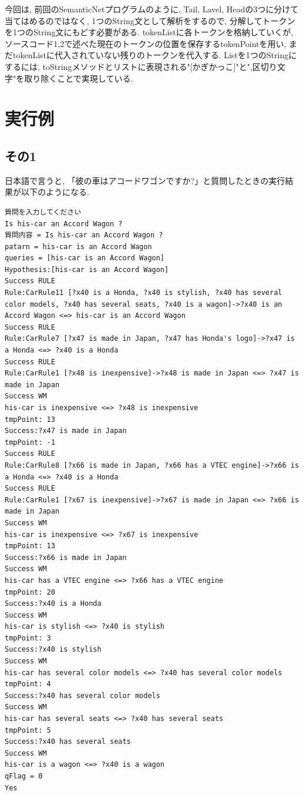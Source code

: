 \documentclass[uplatex,12pt]{jsarticle}
\begin{document}
今回は, 前回のSemanticNetプログラムのように, Tail, Lavel, Headの3つに分けて当てはめるのではなく, 1つのString文として解析をするので, 分解してトークンを1つのString文にもどす必要がある. tokenListに各トークンを格納していくが, ソースコード1,2で述べた現在のトークンの位置を保存するtokenPointを用い, まだtokenListに代入されていない残りのトークンを代入する. Listを1つのStringにするには, toStringメソッドとリストに表現される"[かぎかっこ]"と",区切り文字"を取り除くことで実現している.

\section{実行例}

\subsection{その1}
日本語で言うと, 「彼の車はアコードワゴンですか?」と質問したときの実行結果が以下のようになる.
\begin{lstlisting}
質問を入力してください
Is his-car an Accord Wagon ?
質問内容 = Is his-car an Accord Wagon ?
patarn = his-car is an Accord Wagon
queries = [his-car is an Accord Wagon]
Hypothesis:[his-car is an Accord Wagon]
Success RULE
Rule:CarRule11 [?x40 is a Honda, ?x40 is stylish, ?x40 has several color models, ?x40 has several seats, ?x40 is a wagon]->?x40 is an Accord Wagon <=> his-car is an Accord Wagon
Success RULE
Rule:CarRule7 [?x47 is made in Japan, ?x47 has Honda's logo]->?x47 is a Honda <=> ?x40 is a Honda
Success RULE
Rule:CarRule1 [?x48 is inexpensive]->?x48 is made in Japan <=> ?x47 is made in Japan
Success WM
his-car is inexpensive <=> ?x48 is inexpensive
tmpPoint: 13
Success:?x47 is made in Japan
tmpPoint: -1
Success RULE
Rule:CarRule8 [?x66 is made in Japan, ?x66 has a VTEC engine]->?x66 is a Honda <=> ?x40 is a Honda
Success RULE
Rule:CarRule1 [?x67 is inexpensive]->?x67 is made in Japan <=> ?x66 is made in Japan
Success WM
his-car is inexpensive <=> ?x67 is inexpensive
tmpPoint: 13
Success:?x66 is made in Japan
Success WM
his-car has a VTEC engine <=> ?x66 has a VTEC engine
tmpPoint: 20
Success:?x40 is a Honda
Success WM
his-car is stylish <=> ?x40 is stylish
tmpPoint: 3
Success:?x40 is stylish
Success WM
his-car has several color models <=> ?x40 has several color models
tmpPoint: 4
Success:?x40 has several color models
Success WM
his-car has several seats <=> ?x40 has several seats
tmpPoint: 5
Success:?x40 has several seats
Success WM
his-car is a wagon <=> ?x40 is a wagon
qFlag = 0
Yes
\end{lstlisting}
\end{document}
